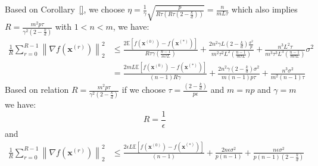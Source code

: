 \begin{corollary}
Based on Corollary~\ref{}, we choose $\eta=\frac{1}{\gamma}\sqrt{\frac{p}{R\tau\left(R\tau \left(2-\frac{k}{d}\right)\right)}}=\frac{n}{mL\tau}$ which also  implies $R=\frac{m^2p\tau}{\gamma^2\left(2-\frac{k}{d}\right)}$ with $1<n<m$, we have:
\begin{align}
        \frac{1}{R}\sum_{r=0}^{R-1}\left\|\nabla f({\boldsymbol{x}}^{(r)})\right\|_2^2&\leq \frac{2 \mathbb{E}\left[f({\boldsymbol{x}}^{(0)})-f({\boldsymbol{x}}^{(*)})\right]}{R\tau \gamma \left(\frac{n-1}{m\tau L}\right)}+\frac{2n^2\gamma L\left(2-\frac{k}{d}\right)\frac{\sigma^2}{p}}{m^2\tau^2L^2 \left(\frac{n-1}{m\tau L}\right)}+\frac{n^3L^2\tau}{m^3\tau^3L^3\left(\frac{n-1}{m\tau L}\right)}\sigma^2\nonumber\\
        &=\frac{2mL \mathbb{E}\left[f({\boldsymbol{x}}^{(0)})-f({\boldsymbol{x}}^{(*)})\right]}{\left(n-1\right)R \gamma }+\frac{2n^2\gamma \left(2-\frac{k}{d}\right)\sigma^2}{m\left(n-1\right) p\tau  }+\frac{n^3\sigma^2}{m^2\left(n-1\right)\tau}
\end{align}
Based on relation $R=\frac{m^2p\tau}{\gamma^2\left(2-\frac{k}{d}\right)}$ if we choose $\tau=\frac{\left(2-\frac{k}{d}\right)}{p\epsilon}$ and $m=np$ and $\gamma=m$ we have:
$$R=\frac{1}{\epsilon}$$ and 
\begin{align}
     \frac{1}{R}\sum_{r=0}^{R-1}\left\|\nabla f({\boldsymbol{x}}^{(r)})\right\|_2^2&\leq \frac{2\epsilon L \mathbb{E}\left[f({\boldsymbol{x}}^{(0)})-f({\boldsymbol{x}}^{(*)})\right]}{\left(n-1\right)}+\frac{2n\epsilon \sigma^2}{p\left(n-1\right)}+\frac{n\epsilon\sigma^2}{p\left(n-1\right)\left(2-\frac{k}{d}\right)}
\end{align}
\end{corollary}

\begin{theorem}
\end{theorem}

